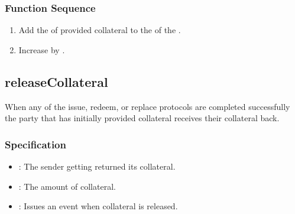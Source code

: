 \documentclass[a4paper,10pt,english]{sphinxmanual}
\begin{document}
\subsubsection{Function Sequence}
\label{\detokenize{spec/collateral:function-sequence}}\begin{enumerate}
%
\item {} 
Add the  of provided collateral to the  of the .

\item {} 
Increase  by .

\end{enumerate}


\subsection{releaseCollateral}
\label{\detokenize{spec/collateral:releasecollateral}}\label{\detokenize{spec/collateral:id2}}
When any of the issue, redeem, or replace protocols are completed successfully the party that has initially provided collateral receives their collateral back.


\subsubsection{Specification}
\label{\detokenize{spec/collateral:id3}}


\begin{itemize}
\item {} 
: The sender getting returned its collateral.

\item {} 
: The amount of collateral.

\end{itemize}

\begin{itemize}
\item {} 
: Issues an event when collateral is released.

\end{itemize}
\end{document}
